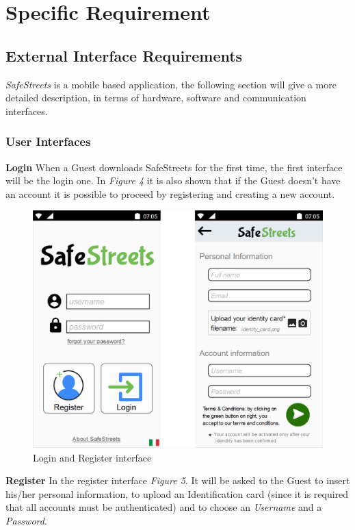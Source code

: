 \section{Specific Requirement}

\subsection{External Interface Requirements}
\textit{SafeStreets} is a mobile based application, the following section will give a more detailed description, in terms of hardware, software and communication interfaces.
\subsubsection{User Interfaces}
    \textbf{Login} \newline When a Guest downloads SafeStreets for the first time, the first interface will be the login one. In \textit{Figure 4} it is also shown that if the Guest doesn't have an account it is possible to proceed by registering and creating a new account.\vspace{1cm}
    \begin{figure}[h]
        \centering
        \includegraphics[scale=0.56]{Images/login_register.png}
        \caption{Login and Register interface}
    \end{figure}\newpage
    \noindent\textbf{Register}\newline
    In the register interface \textit{Figure 5}. It will be asked to the Guest to insert his/her personal information, to upload an Identification card (since it is required that all accounts must be authenticated) and to choose an \textit{Username} and a \textit{Password}.
